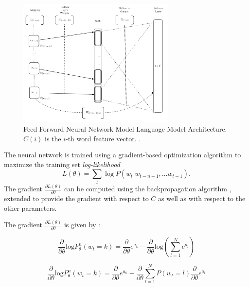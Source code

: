 \begin{figure}[h]
    \centering
    \includegraphics[width=0.7\textwidth]{images/bengio-nnlm.pdf}
    \caption{Feed Forward Neural Network Model Language Model Architecture.
       $C(i)$ is the $i$-th word feature vector.  \cite{Bengio:2003:NPL:944919.944966}.}
    \label{fig:NNLM_architecture}
\end{figure}

The neural network is trained using a gradient-based optimization algorithm
to maximize the training set \textit{log-likelihood}
\begin{equation}
 L(\theta) = \sum_t \log P(w_t | w_{t-n+1}, \ldots w_{t-1}) .
\end{equation}
The gradient $\frac{\partial L(\theta)}{\partial \theta}$
can be computed using the backpropagation algorithm \cite{Bishop:1995:NNP:525960}, extended
to provide the gradient with respect to $C$ as well as with
respect to the other parameters. 



The gradient   $\frac{\partial L(\theta)}{\partial
  \theta}$   is given by  :



\begin{equation*}
  \label{eq:nnlm-grad}
  \frac{\partial }{\partial \theta}\text{log}P_{\theta}^{n}(w_t=k) =
  \frac{\partial }{\partial \theta} e^{a_k} -  \frac{\partial }{\partial
    \theta}\text{log} \left( \sum_{l=1}^N e^{a_l} \right)
 \end{equation*}

\begin{equation}
\label{eq:dlogp-gradient}
  \frac{\partial }{\partial \theta}\text{log}P_{\theta}^{n}(w_t=k)  =  \frac{\partial }{\partial \theta} e^{a_k}  -   \frac{\partial }{\partial
    \theta}  \sum_{l=1}^N  P(w_t = l)  \frac{\partial }{\partial
    \theta}  e^{a_l}   
\end{equation}


